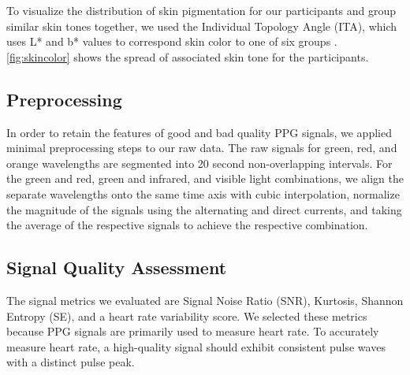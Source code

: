 \documentclass[letterpaper, 10 pt, conference]{ieeeconf}  %
\begin{document}
To visualize the distribution of skin pigmentation for our participants and group similar skin tones together, we used the Individual Topology Angle (ITA), which uses L* and b* values to correspond skin color to one of six groups \cite{ly_research_2020}. \ref{fig:skincolor} shows the spread of associated skin tone for the participants.


\subsection{Preprocessing}
In order to retain the features of good and bad quality PPG signals, we applied minimal preprocessing steps to our raw data. The raw signals for green, red, and orange wavelengths are segmented into 20 second non-overlapping intervals. For the green and red, green and infrared, and visible light combinations, we align the separate wavelengths onto the same time axis with cubic interpolation, normalize the magnitude of the signals using the alternating and direct currents, and taking the average of the respective signals to achieve the respective combination. 

\subsection{Signal Quality Assessment}
The signal metrics we evaluated are Signal Noise Ratio (SNR), Kurtosis, Shannon Entropy (SE), and a heart rate variability score. We selected these metrics because PPG signals are primarily used to measure heart rate. To accurately measure heart rate, a high-quality signal should exhibit consistent pulse waves with a distinct pulse peak.

\end{document}

